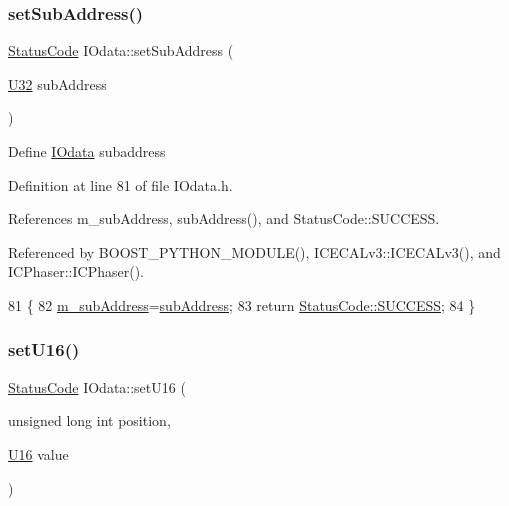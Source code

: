 \subsubsection{\texorpdfstring{set\+Sub\+Address()}{setSubAddress()}}
{\footnotesize\ttfamily \hyperlink{classStatusCode}{Status\+Code} I\+Odata\+::set\+Sub\+Address (\begin{DoxyParamCaption}\item[{\hyperlink{classIOdata_a96fb57f5fcd87b708743abd3c86a5198}{U32}}]{sub\+Address }\end{DoxyParamCaption})\hspace{0.3cm}{\ttfamily [inline]}}

Define \hyperlink{classIOdata}{I\+Odata} subaddress 

Definition at line 81 of file I\+Odata.\+h.



References m\+\_\+sub\+Address, sub\+Address(), and Status\+Code\+::\+S\+U\+C\+C\+E\+SS.



Referenced by B\+O\+O\+S\+T\+\_\+\+P\+Y\+T\+H\+O\+N\+\_\+\+M\+O\+D\+U\+L\+E(), I\+C\+E\+C\+A\+Lv3\+::\+I\+C\+E\+C\+A\+Lv3(), and I\+C\+Phaser\+::\+I\+C\+Phaser().


\begin{DoxyCode}
81                                           \{
82     \hyperlink{classIOdata_a562f84e5cace1e392f1b0fca553fff78}{m\_subAddress}=\hyperlink{classIOdata_a25df48b84364a468373260f823ed9c5f}{subAddress};
83     \textcolor{keywordflow}{return} \hyperlink{classStatusCode_a6f565cbeadc76d14c72f047e5e85eb4badd0da38d3ba0d922efd1f4619bc37ad8}{StatusCode::SUCCESS};
84   \}
\end{DoxyCode}
\mbox{\label{classIOdata_aa9ade5ce3944c8e2b831533b6f876caf}} 
\subsubsection{\texorpdfstring{set\+U16()}{setU16()}}
{\footnotesize\ttfamily \hyperlink{classStatusCode}{Status\+Code} I\+Odata\+::set\+U16 (\begin{DoxyParamCaption}\item[{unsigned long int}]{position,  }\item[{\hyperlink{classIOdata_a1eb45b348534a7c19a4a99b746e693ff}{U16}}]{value }\end{DoxyParamCaption})}



